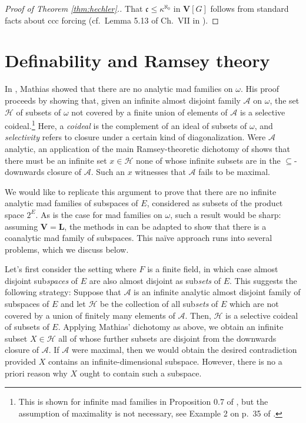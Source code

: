 \documentclass[11pt]{amsart}
\newcommand{\R}{\mathbb{R}}
\newcommand{\LA}{\mathcal{A}}
\theoremstyle{definition}
\theoremstyle{remark}
\newcommand{\LH}{\mathcal{H}}
\renewcommand{\1}{\mathbf{1}}
\newcommand{\V}{\mathbf{V}}
\renewcommand{\L}{\mathbf{L}}
\newcommand{\cc}{\mathfrak{c}}
\begin{document}
\begin{proof}[Proof of Theorem \ref{thm:hechler}.]
	That $\cc\leq\kappa^{\aleph_0}$ in $\V[G]$ follows from standard facts about ccc forcing (cf.~Lemma 5.13 of Ch.~VII in \cite{MR597342}).
\end{proof}






\section{Definability and Ramsey theory}\label{sec:def}

In \cite{MR0491197}, Mathias showed that there are no analytic mad families on $\omega$. His proof proceeds by showing that, given an infinite almost disjoint family $\LA$ on $\omega$, the set $\LH$ of subsets of $\omega$ not covered by a finite union of elements of $\LA$ is a selective coideal.\footnote{This is shown for infinite mad families in Proposition 0.7 of \cite{MR0491197}, but the assumption of maximality is not necessary, see Example 2 on p.~35 of \cite{MR1442262}.} Here, a \emph{coideal} is the complement of an ideal of subsets of $\omega$, and \emph{selectivity} refers to closure under a certain kind of diagonalization. Were $\LA$ analytic, an application of the main Ramsey-theoretic dichotomy of \cite{MR0491197} shows that there must be an infinite set $x\in\LH$ none of whose infinite subsets are in the $\subseteq$-downwards closure of $\LA$. Such an $x$ witnesses that $\LA$ fails to be maximal.

We would like to replicate this argument to prove that there are no infinite analytic mad families of subspaces of $E$, considered as subsets of the product space $2^E$. As is the case for mad families on $\omega$, such a result would be sharp: assuming $\V=\L$, the methods in \cite{MR983001} can be adapted to show that there is a coanalytic mad family of subspaces. This na\"ive approach runs into several problems, which we discuss below.

Let's first consider the setting where $F$ is a finite field, in which case almost disjoint sub\emph{spaces} of $E$ are also almost disjoint as sub\emph{sets} of $E$. This suggests the following strategy: Suppose that $\LA$ is an infinite analytic almost disjoint family of subspaces of $E$ and let $\LH$ be the collection of all sub\emph{sets} of $E$ which are not covered by a union of finitely many elements of $\LA$. Then, $\LH$ is a selective coideal of subsets of $E$. Applying Mathias' dichotomy as above, we obtain an infinite subset $X\in\LH$ all of whose further subsets are disjoint from the downwards closure of $\LA$. If $\LA$ were maximal, then we would obtain the desired contradiction provided $X$ contains an infinite-dimensional subspace. However, there is no a priori reason why $X$ ought to contain such a subspace.
\end{document}
